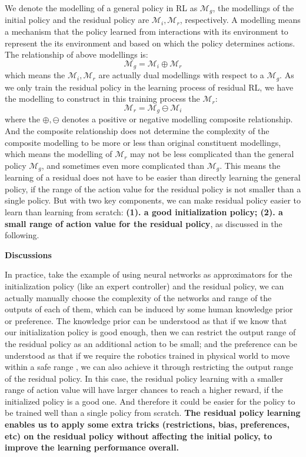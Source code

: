 \documentclass{article}
\begin{document}
We denote the modelling of a general policy in RL as $\mathcal{M}_g$, the modellings of the initial policy and the residual policy are $\mathcal{M}_i, \mathcal{M}_r$, respectively. A modelling means a mechanism that the policy learned from interactions with its environment to represent the its environment and based on which the policy determines actions. The relationship of above modellings is:
\begin{equation}
	\mathcal{M}_g = \mathcal{M}_i \oplus \mathcal{M}_r
 \end{equation}
 which means the $\mathcal{M}_i, \mathcal{M}_r$ are actually dual modellings with respect to a $\mathcal{M}_g$. As we only train the residual policy in the learning process of residual RL, we have the modelling to construct in this training process the $\mathcal{M}_r$:
 \begin{equation}
 \mathcal{M}_r = \mathcal{M}_g \ominus \mathcal{M}_i
 \end{equation}
 where the $\oplus, \ominus$ denotes a positive or negative modelling composite relationship. And the composite relationship does not determine the complexity of the composite modelling to be more or less than original constituent modellings, which means the modelling of $\mathcal{M}_r$ may not be less complicated than the general policy $\mathcal{M}_g$, and sometimes even more complicated than $\mathcal{M}_g$. This means the learning of a residual does not have to be easier than directly learning the general policy, if the range of the action value for the residual policy is not smaller than a single policy. But with two key components, we can make residual policy easier to learn than learning from scratch: \textbf{(1). a good initialization policy; (2). a small range of action value for the residual policy}, as discussed in the following.

\textbf{Discussions}

In practice, take the example of using neural networks as approximators for the initialization policy (like an expert controller) and the residual policy, we can actually manually choose the complexity of the networks and range of the outputs of each of them, which can be induced by some human knowledge prior or preference. The knowledge prior can be understood as that if we know that our initialization policy is good enough, then we can restrict the output range of the residual policy as an additional action to be small; and the preference can be understood as that if we require the robotics trained in physical world to move within a safe range \cite{chow2014algorithms}, we can also achieve it through restricting the output range of the residual policy. In this case, the residual policy learning with a smaller range of action value will have larger chances to reach a higher reward, if the initialized policy is a good one. And therefore it could be easier for the policy to be trained well than a single policy from scratch. \textbf{The residual policy learning enables us to apply some extra tricks (restrictions, bias, preferences, etc) on the residual policy without affecting the initial policy, to improve the learning performance overall.}
\end{document}
